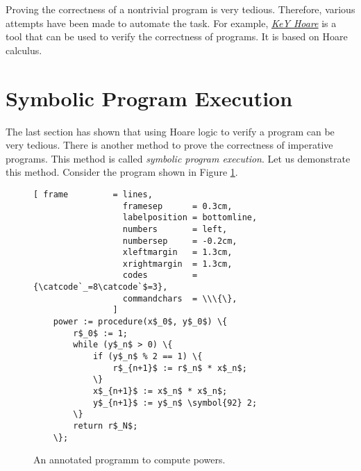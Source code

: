 \remark
Proving the correctness of a nontrivial program is very tedious.
Therefore, various attempts have been made to automate the task.  For
example, \href{http://www.key-project.org/download/hoare/}{\emph{KeY Hoare}}
is a tool that can be used to verify the correctness of programs.  It is based on
Hoare calculus.


\section{Symbolic  Program Execution}
The last section has shown that using Hoare logic to verify a program can be very tedious.
There is another method to prove the correctness of imperative programs.  This method is called
\emph{symbolic program execution}.  Let us demonstrate this method.  Consider the program
shown in Figure \ref{fig:power-iterative-annotated.stlx}.


\begin{figure}[!h]
\centering
\begin{Verbatim}[ frame         = lines, 
                  framesep      = 0.3cm, 
                  labelposition = bottomline,
                  numbers       = left,
                  numbersep     = -0.2cm,
                  xleftmargin   = 1.3cm,
                  xrightmargin  = 1.3cm,
                  codes         = {\catcode`_=8\catcode`$=3},
                  commandchars  = \\\{\},
                ]
    power := procedure(x$_0$, y$_0$) \{
        r$_0$ := 1;
        while (y$_n$ > 0) \{
            if (y$_n$ % 2 == 1) \{
                r$_{n+1}$ := r$_n$ * x$_n$;
            \} 
            x$_{n+1}$ := x$_n$ * x$_n$;
            y$_{n+1}$ := y$_n$ \symbol{92} 2;            
        \} 
        return r$_N$;
    \};
\end{Verbatim}
\vspace*{-0.3cm}
\caption{An annotated programm to compute powers.}
\label{fig:power-iterative-annotated.stlx}
\end{figure} %

